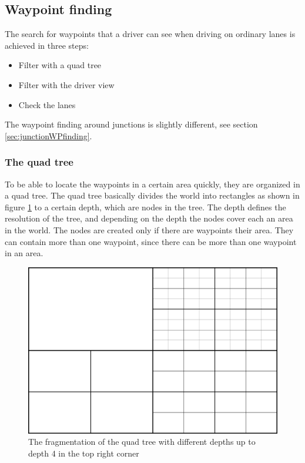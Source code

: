 \subsection{Waypoint finding}

The search for waypoints that a driver can see when driving on ordinary lanes 
is achieved in three steps:

\begin{itemize}
\item Filter with a quad tree
\item Filter with the driver view
\item Check the lanes
\end{itemize}

The waypoint finding around junctions is slightly different, see section 
\ref{sec:junctionWPfinding}.

\subsubsection{The quad tree}
\label{sec:quadTree}

To be able to locate the waypoints in a certain area quickly, they are
organized in a quad tree. The quad tree basically divides the world
into rectangles as shown in figure \ref{fig:quadTree} to a certain
depth, which are nodes in the tree. The depth defines the resolution
of the tree, and depending on the depth the nodes cover each an area
in the world. The nodes are created only if there are waypoints their
area. They can contain more than one waypoint, since there can be more
than one waypoint in an area.\\

\begin{figure}[H]
\begin{center}
\includegraphics[scale=0.5]{images/quadtree.png}
\end{center}
\caption{The fragmentation of the quad tree with different depths up to depth 
4 in the top right corner}
\label{fig:quadTree}
\end{figure}

